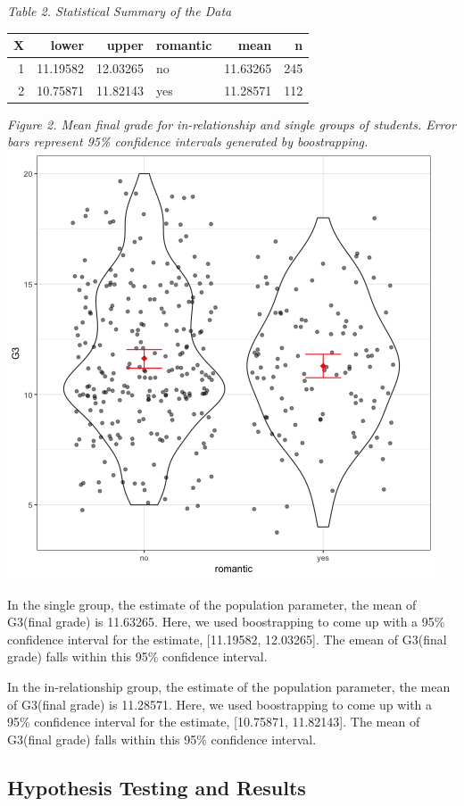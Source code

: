 \documentclass[]{article}
\begin{document}
\emph{Table 2. Statistical Summary of the Data}

\begin{longtable}[]{@{}rrrlrr@{}}
\toprule
X & lower & upper & romantic & mean & n\tabularnewline
\midrule
\endhead
1 & 11.19582 & 12.03265 & no & 11.63265 & 245\tabularnewline
2 & 10.75871 & 11.82143 & yes & 11.28571 & 112\tabularnewline
\bottomrule
\end{longtable}

\emph{Figure 2. Mean final grade for in-relationship and single groups
of students. Error bars represent 95\% confidence intervals generated by
boostrapping.} \includegraphics{../results/CI_plot.png}

In the single group, the estimate of the population parameter, the mean
of G3(final grade) is 11.63265. Here, we used boostrapping to come up
with a 95\% confidence interval for the estimate, {[}11.19582,
12.03265{]}. The emean of G3(final grade) falls within this 95\%
confidence interval.

In the in-relationship group, the estimate of the population parameter,
the mean of G3(final grade) is 11.28571. Here, we used boostrapping to
come up with a 95\% confidence interval for the estimate, {[}10.75871,
11.82143{]}. The mean of G3(final grade) falls within this 95\%
confidence interval.

\subsection{Hypothesis Testing and
Results}\label{hypothesis-testing-and-results}
\end{document}
